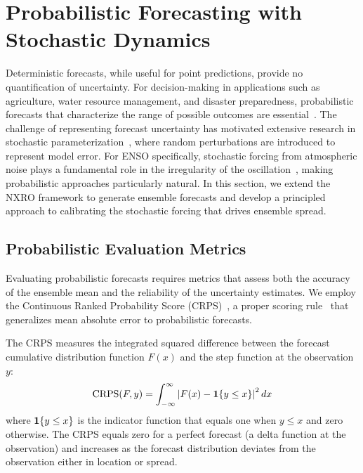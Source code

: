 \section{Probabilistic Forecasting with Stochastic Dynamics}
\label{sec:stochastic}

Deterministic forecasts, while useful for point predictions, provide no quantification of uncertainty. For decision-making in applications such as agriculture, water resource management, and disaster preparedness, probabilistic forecasts that characterize the range of possible outcomes are essential~\cite{gneiting2014probabilistic}. The challenge of representing forecast uncertainty has motivated extensive research in stochastic parameterization~\cite{berner2017stochastic,palmer2009stochastic}, where random perturbations are introduced to represent model error. For ENSO specifically, stochastic forcing from atmospheric noise plays a fundamental role in the irregularity of the oscillation~\cite{kleeman2008stochastic}, making probabilistic approaches particularly natural. In this section, we extend the NXRO framework to generate ensemble forecasts and develop a principled approach to calibrating the stochastic forcing that drives ensemble spread.

\subsection{Probabilistic Evaluation Metrics}

Evaluating probabilistic forecasts requires metrics that assess both the accuracy of the ensemble mean and the reliability of the uncertainty estimates. We employ the Continuous Ranked Probability Score (CRPS)~\cite{hersbach2000}, a proper scoring rule~\cite{gneiting2007} that generalizes mean absolute error to probabilistic forecasts.

The CRPS measures the integrated squared difference between the forecast cumulative distribution function $F(x)$ and the step function at the observation $y$:
\begin{equation}
    \text{CRPS}(F, y) = \int_{-\infty}^{\infty} \left| F(x) - \mathbf{1}\{y \leq x\} \right|^2 dx
    \label{eq:crps}
\end{equation}
where $\mathbf{1}\{y \leq x\}$ is the indicator function that equals one when $y \leq x$ and zero otherwise. The CRPS equals zero for a perfect forecast (a delta function at the observation) and increases as the forecast distribution deviates from the observation either in location or spread.

